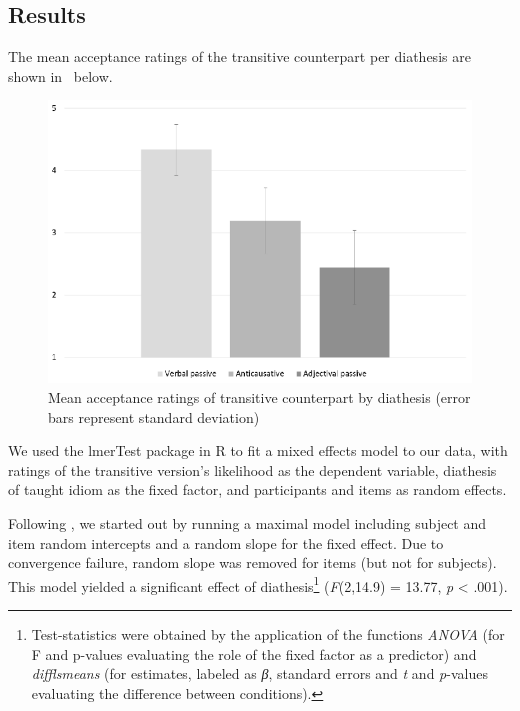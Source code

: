 \documentclass[output=paper]{langsci/langscibook}
\begin{document}
\subsection{Results}  %

\largerpage[2]
The mean acceptance ratings of the transitive counterpart per diathesis are
shown in~ below.

\begin{figure}

    \centering
    \caption{Mean acceptance ratings of transitive counterpart by diathesis
    (error bars represent standard deviation)}\label{fig:key:20.2}

    \includegraphics[width=.9\textwidth]{./img/20.2.eps}

\end{figure}

We used the lmerTest package in R \parencite{Kuzetal2015} to fit a mixed
effects model to our data, with ratings of the transitive version’s likelihood
as the dependent variable, diathesis of taught idiom as the fixed factor, and
participants and items as random effects.

Following \citet{Barretal2013}, we started out by running a maximal model
including subject and item random intercepts and a random slope for the fixed
effect. Due to convergence failure, random slope was removed for items (but not
for subjects). This model yielded a significant effect of
diathesis\footnote{Test-statistics were obtained by the application of the
    functions \emph{ANOVA} (for F and p-values evaluating the role of the fixed
    factor as a predictor) and \emph{difflsmeans} (for estimates, labeled as
\emph{β}, standard errors and \emph{t} and \emph{p}-values evaluating the
difference between conditions).} (\emph{F}(2,14.9) = 13.77, \emph{p} < .001).
\end{document}
